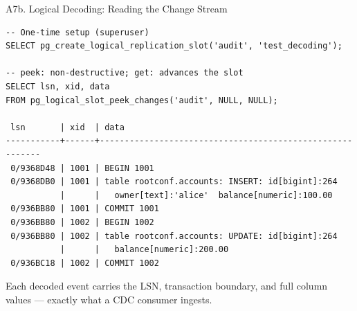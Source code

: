 \documentclass[aspectratio=169,10pt]{beamer}
\begin{document}
\begin{frame}[fragile]{A7b. Logical Decoding: Reading the Change Stream}

\begin{lstlisting}[style=ascii]
-- One-time setup (superuser)
SELECT pg_create_logical_replication_slot('audit', 'test_decoding');

-- peek: non-destructive; get: advances the slot
SELECT lsn, xid, data
FROM pg_logical_slot_peek_changes('audit', NULL, NULL);

 lsn       | xid  | data
-----------+------+----------------------------------------------------------
 0/9368D48 | 1001 | BEGIN 1001
 0/9368DB0 | 1001 | table rootconf.accounts: INSERT: id[bigint]:264
           |      |   owner[text]:'alice'  balance[numeric]:100.00
 0/936BB80 | 1001 | COMMIT 1001
 0/936BB80 | 1002 | BEGIN 1002
 0/936BB80 | 1002 | table rootconf.accounts: UPDATE: id[bigint]:264
           |      |   balance[numeric]:200.00
 0/936BC18 | 1002 | COMMIT 1002
\end{lstlisting}

  \vspace{0.4em}
  {\small Each decoded event carries the LSN, transaction boundary, and full
  column values — exactly what a CDC consumer ingests.}

\end{frame}
\end{document}

